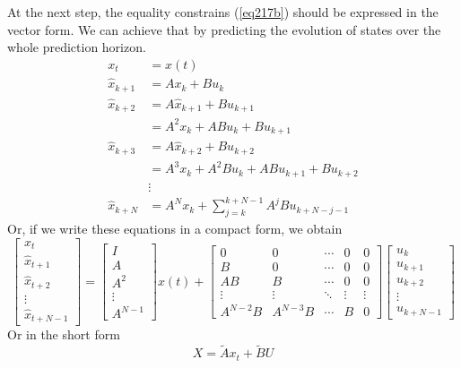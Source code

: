 At the next step, the equality constrains (\ref{eq217b}) should be expressed in the vector form. We can achieve that by predicting the evolution of states over the whole prediction horizon.
\begin{equation}
\begin{split}
x_t &= x(t)\\
\hat{x}_{k+1} &= Ax_k + Bu_k\\
\hat{x}_{k+2} &= A\hat{x}_{k+1} + Bu_{k+1}\\
&= A^2x_k + ABu_k + Bu_{k+1}\\
\hat{x}_{k+3} &= A\hat{x}_{k+2} + Bu_{k+2}\\
&= A^3x_k + A^2Bu_k + ABu_{k+1} + Bu_{k+2}\\
&\vdots\\
\hat{x}_{k+N} &= A^Nx_k+\sum_{j=k}^{k+N-1}A^jBu_{k+N-j-1}
\end{split}
\end{equation}
Or, if we write these equations in a compact form, we obtain
\begin{equation}
	\begin{bmatrix}
	x_t\\\hat{x}_{t+1}\\ \hat{x}_{t+2}\\\vdots\\ \hat{x}_{t+N-1}
	\end{bmatrix} = 
	\begin{bmatrix}I\\A\\A^2\\ \vdots \\ A^{N-1}\end{bmatrix}x(t) + 
	\begin{bmatrix}
	0& 0&\cdots&0&0\\
	B&0&\cdots&0&0\\
	AB&B&\cdots&0&0\\
	\vdots&\vdots&\ddots&\vdots&\vdots\\
	A^{N-2}B&A^{N-3}B&\cdots&B&0\end{bmatrix}
	\begin{bmatrix}u_k\\u_{k+1}\\u_{k+2}\\\vdots\\u_{k+N-1}\end{bmatrix}
\end{equation}
Or in the short form
\begin{equation}\label{eq227}
	X = \tilde{A}x_t + \tilde{B}U
\end{equation}
